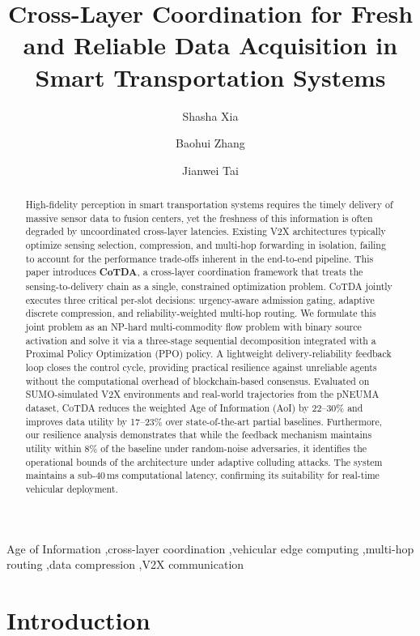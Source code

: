 \documentclass[final,3p,times,review,sort&compress]{elsarticle}
\title{Cross-Layer Coordination for Fresh and Reliable Data Acquisition in Smart Transportation Systems}
\author[inst1]{Shasha Xia}
\author[inst2]{Baohui Zhang}
\author[inst2]{Jianwei Tai\corref{cor1}}
\affiliation[inst1]{organization={Institute of Dataspace, Hefei Comprehensive National Science Center, 230088. 
},
  city={Hefei},
  country={China}}
\affiliation[inst2]{organization={School of Internet, Anhui University, 230601 },
  city={Hefei},
  country={China}}
\begin{document}
\begin{frontmatter}

\begin{abstract}
High-fidelity perception in smart transportation systems requires the timely delivery of massive sensor data to fusion centers, yet the freshness of this information is often degraded by uncoordinated cross-layer latencies. Existing V2X architectures typically optimize sensing selection, compression, and multi-hop forwarding in isolation, failing to account for the performance trade-offs inherent in the end-to-end pipeline. This paper introduces \textbf{CoTDA}, a cross-layer coordination framework that treats the sensing-to-delivery chain as a single, constrained optimization problem. CoTDA jointly executes three critical per-slot decisions: urgency-aware admission gating, adaptive discrete compression, and reliability-weighted multi-hop routing. We formulate this joint problem as an NP-hard multi-commodity flow problem with binary source activation and solve it via a three-stage sequential decomposition integrated with a Proximal Policy Optimization (PPO) policy. A lightweight delivery-reliability feedback loop closes the control cycle, providing practical resilience against unreliable agents without the computational overhead of blockchain-based consensus. Evaluated on SUMO-simulated V2X environments and real-world trajectories from the pNEUMA dataset, CoTDA reduces the weighted Age of Information (AoI) by 22--30\% and improves data utility by 17--23\% over state-of-the-art partial baselines. Furthermore, our resilience analysis demonstrates that while the feedback mechanism maintains utility within 8\% of the baseline under random-noise adversaries, it identifies the operational bounds of the architecture under adaptive colluding attacks. The system maintains a sub-40\,ms computational latency, confirming its suitability for real-time vehicular deployment.
\end{abstract}

\begin{keyword}
Age of Information \sep cross-layer coordination \sep vehicular edge computing \sep multi-hop routing \sep data compression \sep V2X communication
\end{keyword}

\end{frontmatter}

\section{Introduction}
\label{sec:introduction}
\end{document}
